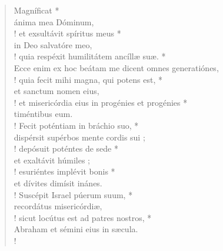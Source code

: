 



\begin{verse}
 


Magníficat *\\
ánima mea Dóminum,\\!
\vin et exsultávit spíritus meus *\\
\vin in Deo salvatóre meo,\\!
quia respéxit humilitátem ancíllæ suæ. *\\
Ecce enim ex hoc beátam me dicent 
	omnes generatiónes,\\!
\vin quia fecit mihi magna, qui potens est, *\\
\vin et sanctum nomen eius,\\!
et misericórdia eius in progénies et progénies *\\
timéntibus eum.\\!
\vin Fecit poténtiam in bráchio suo, *\\
\vin dispérsit supérbos mente cordis sui ;\\!
depósuit poténtes de sede *\\
et exaltávit húmiles ;\\!
\vin esuriéntes implévit bonis *\\
\vin et dívites dimísit inánes.\\!
Suscépit Israel púerum suum, *\\
recordátus misericórdiæ,\\!
\vin sicut locútus est ad patres nostros, *\\
\vin Abraham et sémini eius in sæcula.\\!

\end{verse}
